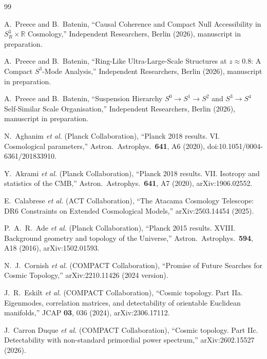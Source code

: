\documentclass[aps,prd,onecolumn,superscriptaddress,longbibliography,nofootinbib,notitlepage]{revtex4-2}
\begin{document}
\begin{thebibliography}{99}

A.~Preece and B.~Batenin,
``Causal Coherence and Compact Null Accessibility in
  $S^3_R \times \mathbb{R}$ Cosmology,''
Independent Researchers, Berlin (2026), manuscript in preparation.

A.~Preece and B.~Batenin,
``Ring-Like Ultra-Large-Scale Structures at $z \approx 0.8$:
  A Compact $S^3$-Mode Analysis,''
Independent Researchers, Berlin (2026), manuscript in preparation.

A.~Preece and B.~Batenin,
``Suspension Hierarchy $S^0 \to S^1 \to S^2$
  and $S^3 \to S^4$ Self-Similar Scale Organisation,''
Independent Researchers, Berlin (2026), manuscript in preparation.

N.~Aghanim \textit{et al.} (Planck Collaboration),
``Planck 2018 results. VI. Cosmological parameters,''
Astron.\ Astrophys.\ \textbf{641}, A6 (2020),
doi:10.1051/0004-6361/201833910.

Y.~Akrami \textit{et al.} (Planck Collaboration),
``Planck 2018 results. VII. Isotropy and statistics of the CMB,''
Astron.\ Astrophys.\ \textbf{641}, A7 (2020),
arXiv:1906.02552.


E.~Calabrese \textit{et al.} (ACT Collaboration),
``The Atacama Cosmology Telescope: DR6 Constraints on Extended Cosmological Models,''
arXiv:2503.14454 (2025).

P.~A.~R.~Ade \textit{et al.} (Planck Collaboration),
``Planck 2015 results. XVIII. Background geometry and topology of the Universe,''
Astron.\ Astrophys.\ \textbf{594}, A18 (2016),
arXiv:1502.01593.

N.~J.~Cornish \textit{et al.} (COMPACT Collaboration),
``Promise of Future Searches for Cosmic Topology,''
arXiv:2210.11426 (2024 version).

J.~R.~Eskilt \textit{et al.} (COMPACT Collaboration),
``Cosmic topology. Part IIa. Eigenmodes, correlation matrices, and detectability
  of orientable Euclidean manifolds,''
JCAP \textbf{03}, 036 (2024), arXiv:2306.17112.


J.~Carron Duque \textit{et al.} (COMPACT Collaboration),
``Cosmic topology. Part IIc. Detectability with non-standard primordial power spectrum,''
arXiv:2602.15527 (2026).


\end{thebibliography}
\end{document}
